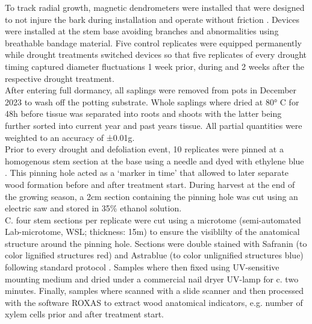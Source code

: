 \documentclass{article}
\begin{document}
	To track radial growth, magnetic dendrometers were installed that were designed to not injure the bark during installation and operate without friction \citep{clonchHighPrecisionZerofriction2021}. Devices were installed at the stem base avoiding branches and abnormalities using breathable bandage material. Five control replicates were equipped permanently while drought treatments switched devices so that five replicates of every drought timing captured diameter fluctuations 1 week prior, during and 2 weeks after the respective drought treatment. \\

	After entering full dormancy, all saplings were removed from pots in December 2023 to wash off the potting substrate. Whole saplings where dried at 80° C for 48h before tissue was separated into roots and shoots with the latter being further sorted into current year and past years tissue. All partial quantities were weighted to an accuracy of ±0.01g.\\ 


	Prior to every drought and defoliation event, 10 replicates were pinned at a homogenous stem section at the base using a needle and dyed with ethylene blue \citep{gartnerCambialActivityMoringa2021a}. This pinning hole acted as a `marker in time' that allowed to later separate wood formation before and after treatment start. During harvest at the end of the growing season, a 2cm section containing the pinning hole was cut using an electric saw and stored in 35\% ethanol solution. \\
	C. four stem sections per replicate were cut using a microtome (semi-automated Lab-microtome, WSL; thickness: 15\textmu m) to ensure the visiblilty of the anatomical structure around the pinning hole. Sections were double stained with Safranin (to color lignified structures red) and Astrablue (to color unlignified structures blue) following standard protocol \citep{gartnerMicroscopicPreparationTechniques2013}. Samples where then fixed using UV-sensitive mounting medium and dried under a commercial nail dryer UV-lamp for c. two minutes. Finally, samples where scanned with a slide scanner and then processed with the software ROXAS to extract wood anatomical indicators, e.g. number of xylem cells prior and after treatment start.
				\newpage
				
\end{document}
